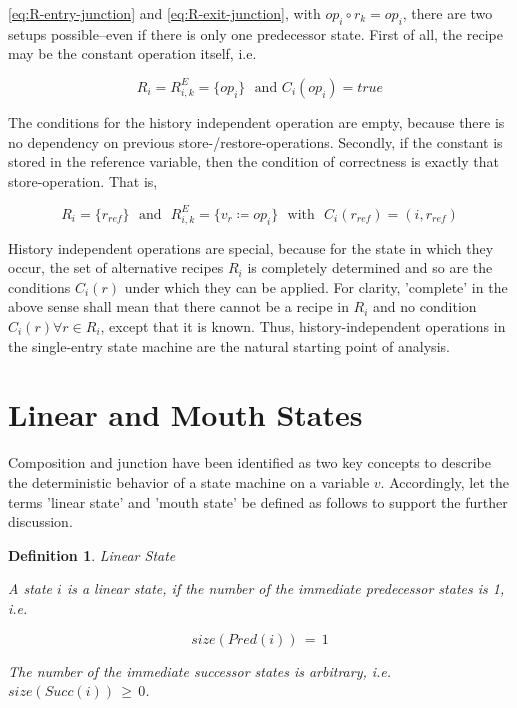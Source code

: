\documentclass[12pt,a4paper]{scrartcl}
\newtheorem{definition}{Definition}
\begin{document}
\ref{eq:R-entry-junction} and \ref{eq:R-exit-junction}, with $op_i\circ
r_k=op_i$, there are two setups possible--even if there is only one predecessor
state. First of all, the recipe may be the constant operation itself, i.e.

\begin{equation} \label{eq:R-entry-junction}
    R_i = R^E_{i,k} = \{ op_i \} \,\,\mbox{ and } C_i(op_i) = true
\end{equation}

The conditions for the history independent operation are empty, because there 
is no dependency on previous store-/restore-operations. Secondly, if the constant
is stored in the reference variable, then the condition of correctness is
exactly that store-operation. That is, 

\begin{equation} \label{eq:R-entry-junction}
    R_i = \{ r_{ref} \} \,\,\mbox{ and }  \,\, R^E_{i,k} = \{ v_r \coloneq op_i \}
                        \,\,\mbox{ with } \,\, C_i(r_{ref}) = (i, r_{ref})
\end{equation}

History independent operations are special, because for the state in which they
occur, the set of alternative recipes $R_i$ is completely determined and so are
the conditions $C_i(r)$ under which they can be applied. For clarity,
'complete' in the above sense shall mean that there cannot be a recipe in $R_i$
and no condition $C_i(r)\forall r\in R_i$, except that it is known. Thus,
history-independent operations in the single-entry state machine are the
natural starting point of analysis.

\section{Linear and Mouth States}

Composition and junction have been identified as two key concepts to describe
the deterministic behavior of a state machine on a variable $v$. Accordingly,
let the terms 'linear state' and 'mouth state' be defined as follows to support
the further discussion. 

\begin{definition} Linear State

    A state $i$ is a linear state, if the number of the immediate predecessor 
    states is 1, i.e. 

    \begin{equation}
                size(Pred(i))\,=\,1
    \end{equation}

    The number of the immediate successor states is arbitrary, i.e.
    $size(Succ(i))\,\ge\,0$.

\end{definition}
\end{document}
